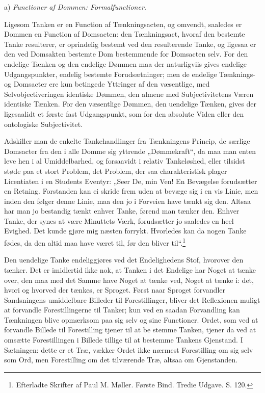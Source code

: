 \documentclass[12pt]{book}
\newcommand{\opage}[1]{\marginnote{\footnotesize\textit{[#1]}}}
\begin{document}
\medskip
\noindent\hspace*{1em}a) \emph{Functioner af Dommen: Formalfunctioner.}
\medskip

Ligesom Tanken er en Function af Tænkningsacten, og omvendt,
saaledes er Dommen en Function af Domsacten: den
Tænkningsact, hvoraf den bestemte Tanke resulterer, er oprindelig
bestemt ved den resulterende Tanke, og ligesaa er den
ved Domsakten bestemte Dom bestemmende for Domsacten
selv. For den endelige Tænken og den endelige Dømmen maa
der naturligviis gives endelige Udgangspunkter, endelig bestemte
Forudsætninger; men de endelige Tænknings- og Domsacter
\opage{18}ere kun betingede Yttringer af den væsentlige, med Selvobjectiveringen
identiske Dømmen, den almene med Subjectivitetens
Væren identiske Tænken. For den væsentlige Dømmen, den
uendelige Tænken, gives der ligesaalidt et første fast Udgangspunkt,
som for den absolute Viden eller den ontologiske Subjectivitet.

Adskiller man de enkelte Tankehandlinger fra Tænkningens
Princip, de særlige Domsacter fra den i alle Domme sig
yttrende „Dømmekraft“, da maa man enten leve hen i al
Umiddelbarhed, og forsaavidt i relativ Tankeløshed, eller tilsidst
støde paa et stort Problem, det Problem, der saa charakteristisk
plager Licentiaten i en Students Eventyr: „Seer De,
min Ven! En Bevægelse forudsætter en Retning. Forstanden
kan ei skride frem uden at bevæge sig i en vis Linie, men
inden den følger denne Linie, maa den jo i Forveien have
tænkt sig den. Altsaa har man jo bestandig tænkt enhver
Tanke, førend man tænker den. Enhver Tanke, der synes at
være Minuttets Værk, forudsætter jo saaledes en heel Evighed.
Det kunde gjøre mig næsten forrykt. Hvorledes kan da nogen
Tanke fødes, da den altid maa have været til, før den bliver
til“.\footnote{Efterladte Skrifter af Paul M. Møller. Første Bind. Tredie Udgave.
S. 120.}%

Den uendelige Tanke endeliggjøres ved det Endelighedens
Stof, hvorover den tænker. Det er imidlertid ikke nok, at
Tanken i det Endelige har Noget at tænke over, den maa med
det Samme have Noget at tænke ved, Noget at tænke i: det,
hvori og hvorved der tænkes, er Sproget. Først naar Sproget
forvandler Sandsningens umiddelbare Billeder til Forestillinger,
bliver det Reflexionen muligt at forvandle Forestillingerne til
Tanker; kun ved en saadan Forvandling kan Tænkningen
blive opmærksom paa sig selv og sine Functioner. Ordet,
som ved at forvandle Billede til Forestilling tjener til at be%
\opage{19}stemme Tanken, tjener da ved at omsætte Forestillingen i
Billede tillige til at bestemme Tankens Gjenstand. I Sætningen:
dette er et Træ, vækker Ordet ikke nærmest Forestilling
om sig selv som Ord, men Forestilling om det tilværende
Træ, altsaa om Gjenstanden.
\end{document}

